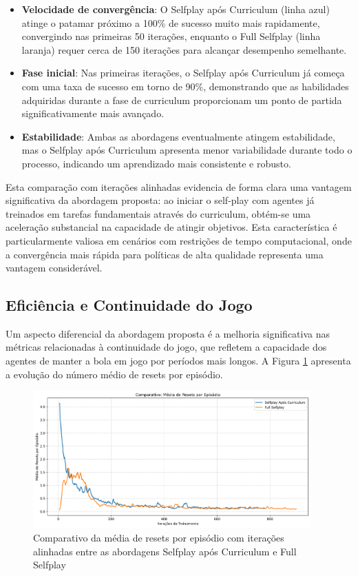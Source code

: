 \begin{itemize}
    \item \textbf{Velocidade de convergência}: O Selfplay após Curriculum (linha azul) atinge o patamar próximo a 100\% de sucesso muito mais rapidamente, convergindo nas primeiras 50 iterações, enquanto o Full Selfplay (linha laranja) requer cerca de 150 iterações para alcançar desempenho semelhante.
    
    \item \textbf{Fase inicial}: Nas primeiras iterações, o Selfplay após Curriculum já começa com uma taxa de sucesso em torno de 90\%, demonstrando que as habilidades adquiridas durante a fase de curriculum proporcionam um ponto de partida significativamente mais avançado.
    
    \item \textbf{Estabilidade}: Ambas as abordagens eventualmente atingem estabilidade, mas o Selfplay após Curriculum apresenta menor variabilidade durante todo o processo, indicando um aprendizado mais consistente e robusto.
\end{itemize}

Esta comparação com iterações alinhadas evidencia de forma clara uma vantagem significativa da abordagem proposta: ao iniciar o self-play com agentes já treinados em tarefas fundamentais através do curriculum, obtém-se uma aceleração substancial na capacidade de atingir objetivos. Esta característica é particularmente valiosa em cenários com restrições de tempo computacional, onde a convergência mais rápida para políticas de alta qualidade representa uma vantagem considerável.

\subsection{Eficiência e Continuidade do Jogo}

Um aspecto diferencial da abordagem proposta é a melhoria significativa nas métricas relacionadas à continuidade do jogo, que refletem a capacidade dos agentes de manter a bola em jogo por períodos mais longos. A Figura \ref{fig:total_resets} apresenta a evolução do número médio de resets por episódio.

\begin{figure}[H]
    \centering
    \includegraphics[width=0.95\textwidth]{fig/graficos_trabalho/graficos_experimentos/geral/comparativo_resets_por_episodio.png}
    \caption{Comparativo da média de resets por episódio com iterações alinhadas entre as abordagens Selfplay após Curriculum e Full Selfplay}
    \label{fig:total_resets}
\end{figure}

